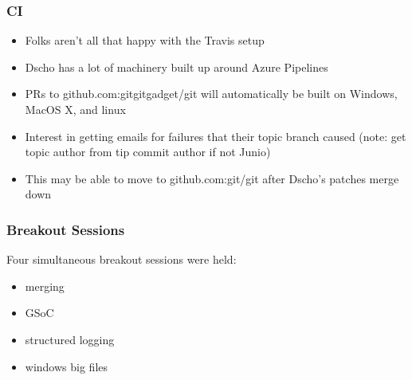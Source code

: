 \documentclass[t]{beamer}
\begin{document}
\begin{frame}
  \frametitle{CI}

  \begin{itemize}
    \item Folks aren't all that happy with the Travis setup
    \item Dscho has a lot of machinery built up around Azure Pipelines
    \item PRs to github.com:gitgitgadget/git will automatically be built on
      Windows, MacOS X, and linux
    \item Interest in getting emails for failures that their topic branch
      caused (note: get topic author from tip commit author if not Junio)
    \item This may be able to move to github.com:git/git after Dscho's patches
      merge down
  \end{itemize}

\end{frame}


\begin{frame}
  \frametitle{Breakout Sessions}

  Four simultaneous breakout sessions were held:
  \begin{itemize}
    \item merging
    \item GSoC
    \item structured logging
    \item windows big files
  \end{itemize}

\end{frame}
\end{document}
